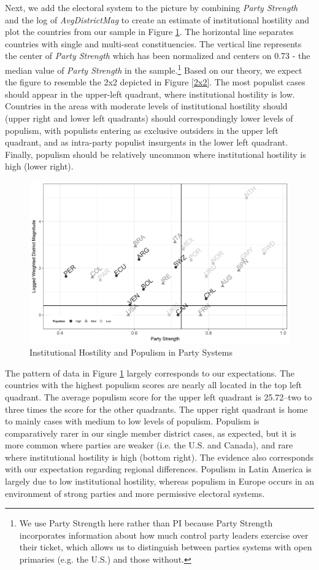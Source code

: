 \documentclass[a4paper,12pt]{article}\usepackage[]{graphicx}\usepackage[]{color}
\begin{document}
Next, we add the electoral system to the picture by combining \textit{Party Strength} and the log of \textit{AvgDistrictMag} to create an estimate of institutional hostility and plot the countries from our sample in Figure \ref{grid}. The horizontal line  separates countries with single and multi-seat constituencies. The vertical line represents the center of \textit{Party Strength} which has been normalized and centers on 0.73 - the median value of \textit{Party Strength} in the sample.\footnote{We use Party Strength here rather than PI because Party Strength incorporates information about how much control party leaders exercise over their ticket, which allows us to distinguish between parties systems with open primaries (e.g. the U.S.) and those without.} Based on our theory, we expect the figure to resemble the 2x2 depicted in Figure \ref{2x2}. The most populist cases should appear in the upper-left quadrant, where institutional hostility is low. Countries in the areas with moderate levels of institutional hostility should (upper right and lower left quadrants) should correspondingly lower levels of populism, with populists entering as exclusive outsiders in the upper left quadrant, and as intra-party populist insurgents in the lower left quadrant. Finally, populism should be relatively uncommon where institutional hostility is high (lower right).
\begin{figure}[!htbp]
\centering
\parbox{5in}{\includegraphics[width=120mm, height = 70mm]{fig3.jpg}}%
\qquad
\caption{Institutional Hostility and Populism in Party Systems}%
\label{grid}%
\end{figure}
\par
The pattern of data in Figure \ref{grid} largely corresponds to our expectations. The countries with the highest populism scores are nearly all located in the top left quadrant. The average populism score for the upper left quadrant is 25.72--two to three times the score for the other quadrants. The upper right quadrant is home to mainly cases with medium to low levels of populism. Populism is comparatively rarer in our single member district cases, as expected, but it is more common where parties are weaker (i.e. the U.S. and Canada), and rare where institutional hostility is high (bottom right). The evidence also corresponds with our expectation regarding regional differences. Populism in Latin America is largely due to low institutional hostility, whereas populism in Europe occurs in an environment of strong parties and more permissive electoral systems. 
\end{document}
